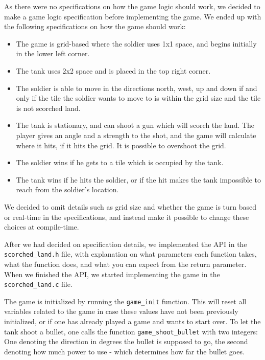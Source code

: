 As there were no specifications on how the game logic should work, we
decided to make a game logic specification before implementing the game.
We ended up with the following specifications on how the game should
work:
\begin{itemize}
    \item The game is grid-based where the soldier uses 1x1 space, and
            begins initially in the lower left corner.
    \item The tank uses 2x2 space and is placed in the top right corner.
    \item The soldier is able to move in the directions north, west, up
            and down if and only if the tile the soldier wants to move
            to is within the grid size and the tile is not scorched land.
    \item The tank is stationary, and can shoot a gun which will scorch
            the land. The player gives an angle and a strength to the
            shot, and the game will calculate where it hits, if it hits the grid. It is possible to overshoot the grid.
    \item The soldier wins if he gets to a tile which is
            occupied by the tank.
    \item The tank wins if he hits the soldier, or if the hit makes
            the tank impossible to reach from the soldier's location.
\end{itemize}

We decided to omit details such as grid size and whether the game is
turn based or real-time in the specifications, and instead make it
possible to change these choices at compile-time.

After we had decided on specification details, we implemented the
API in the \texttt{scorched\_land.h} file, with explanation on what
parameters each function takes, what the function does, and what you can
expect from the return parameter. When we finished the API, we started
implementing the game in the \texttt{scorched\_land.c} file.

The game is initialized by running the \texttt{game\_init} function.
This will reset all variables related to the game in case these values
have not been previously initialized, or if one has already played a
game and wants to start over. To let the tank shoot a bullet, one calls
the function \texttt{game\_shoot\_bullet} with two integers: One
denoting the direction in degrees the bullet is supposed to go, the
second denoting how much power to use - which determines how far the
bullet goes.

